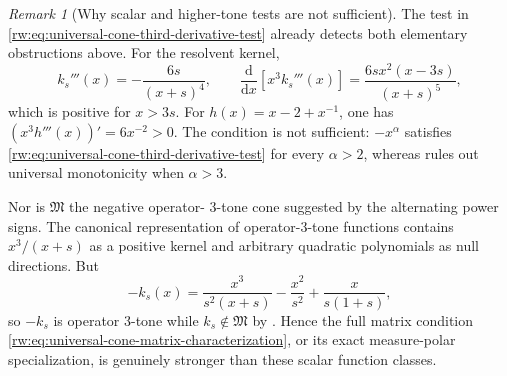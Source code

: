 \documentclass[11pt]{article}
\theoremstyle{remark}
\newtheorem{remark}[remark]{Remark}
\newcommand{\1}{\mathbbm{1}}
\begin{document}
\begin{remark}[Why scalar and higher-tone tests are not sufficient]
\label{rw:rem:universal-cone-false-simplifications}
The test in
\eqref{rw:eq:universal-cone-third-derivative-test} already detects
both elementary obstructions above.  For the resolvent kernel,
\begin{equation*}
 k_s'''(x)=-\frac{6s}{(x+s)^4},
 \qquad
 \frac{\mathrm d}{\mathrm dx}[x^3k_s'''(x)]
 =\frac{6sx^2(x-3s)}{(x+s)^5},
\end{equation*}
which is positive for \(x>3s\).  For
\(h(x)=x-2+x^{-1}\), one has
\((x^3h'''(x))'=6x^{-2}>0\).  The condition is not sufficient:
\(-x^\alpha\) satisfies
\eqref{rw:eq:universal-cone-third-derivative-test} for every
\(\alpha>2\), whereas
 rules out universal monotonicity
when \(\alpha>3\).

Nor is \(\mathfrak M\) the negative operator-
\(3\)-tone cone suggested by the alternating power signs.  The
canonical representation of operator-\(3\)-tone functions
\cite[Theorem~5.1]{franz2014higher} contains
\(x^3/(x+s)\) as a positive kernel and arbitrary quadratic
polynomials as null directions.  But
\begin{equation}
 -k_s(x)=\frac{x^3}{s^2(x+s)}-\frac{x^2}{s^2}
 +\frac{x}{s(1+s)},
 \label{rw:eq:resolvent-negative-three-tone}
\end{equation}
so \(-k_s\) is operator \(3\)-tone while
\(k_s\notin\mathfrak M\) by
.  Hence the full matrix condition
\eqref{rw:eq:universal-cone-matrix-characterization}, or its exact
measure-polar specialization, is genuinely stronger than these
scalar function classes.
\end{remark}
\end{document}
